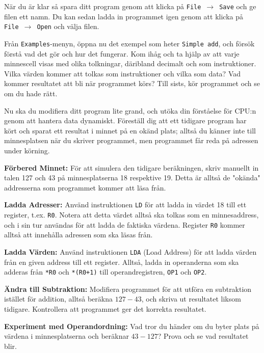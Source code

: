 \begin{Datorarbete}
    När du är klar så spara ditt program genom att klicka på \texttt{File}~$\rightarrow$~\texttt{Save} och ge filen ett namn. Du kan sedan ladda in programmet igen genom att klicka på \texttt{File}~$\rightarrow$~\texttt{Open} och välja filen.
    \vspace{-2mm}

    \item {} Från \texttt{Examples}-menyn, öppna nu det exempel som heter \texttt{Simple~add}, och försök förstå vad det gör och hur det fungerar. Kom ihåg och ta hjälp av att varje minnescell visas med olika tolkningar, däribland decimalt och som instruktioner. Vilka värden kommer att tolkas som instruktioner och vilka som data? Vad kommer resultatet att bli när programmet körs? Till sists, kör programmet och se om du hade rätt.
    
    \item {} Nu ska du modifiera ditt program lite grand, och utöka din förståelse för CPU:n genom att hantera data dynamiskt. Föreställ dig att ett tidigare program har kört och sparat ett resultat i minnet på en okänd plats; alltså du känner inte till minnesplatsen när du skriver programmet, men programmet får reda på adressen under körning.

    \begin{Deluppgifter}
        \item \textbf{Förbered Minnet:} För att simulera den tidigare beräkningen, skriv manuellt in talen 127 och 43 på minnesplatserna 18 respektive 19. Detta är alltså de "okända" addresserna som programmet kommer att läsa från.
        \item \textbf{Ladda Adresser:} Använd instruktionen \texttt{LD} för att ladda in värdet 18 till ett register, t.ex. \texttt{R0}. Notera att detta värdet alltså ska tolkas som en minnesaddress, och i sin tur användas för att ladda de faktiska värdena. Register \texttt{R0} kommer alltså att innehålla adressen som ska läsas från.
        \item \textbf{Ladda Värden:} Använd instruktionen \texttt{LDA} (Load Address) för att ladda värden från en given address till ett register. Alltså, ladda in operanderna som ska adderas från \texttt{*R0} och \texttt{*(R0+1)} till operandregistren, \texttt{OP1} och \texttt{OP2}.
        \item \textbf{Ändra till Subtraktion:} Modifiera programmet för att utföra en subtraktion istället för addition, alltså beräkna \(127-43\), och skriva ut resultatet liksom tidigare. Kontrollera att programmet ger det korrekta resultatet.
        \item \textbf{Experiment med Operandordning:} Vad tror du händer om du byter plats på värdena i minnesplatserna och beräknar \(43-127\)? Prova och se vad resultatet blir.
    \end{Deluppgifter}


\end{Datorarbete}
